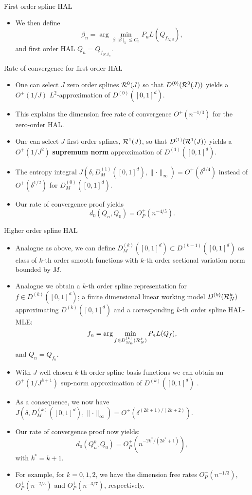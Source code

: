 \documentclass[t]{beamer}
\newlength{\wideitemsep}
\let\olditem\item
\renewcommand{\item}{\setlength{\itemsep}{\wideitemsep}\olditem}
\newcommand{\pl}{\parallel}
\begin{document}
\begin{frame}{First order spline HAL}
\begin{itemize}
\item We then define
\[
\beta_n=\arg\min_{\beta,\mid \beta\mid_1\leq C_n} P_n L(Q_{f_{N,\beta}}),\]
and first order HAL $Q_n=Q_{f_{N,\beta_n}}$.
\end{itemize}
\end{frame}
\begin{frame}{Rate of convergence for first order HAL}
\begin{itemize}
\item One can select $J$ zero order splines ${\cal R}^0(J)$ so that  $D^{(0)}({\cal R}^0(J))$ yields a $O^+(1/J)$ $L^2$-approximation of
$D^{(0)}([0,1]^d)$.
\item This explains the dimension free rate of convergence $O^+(n^{-1/3})$ for the zero-order HAL.
\item One can select $J$ first order splines, ${\cal R}^1(J)$, so that $D^{(1)}({\cal R}^1(J))$ yields a $O^+(1/J^2)$ {\bf supremum norm} approximation of $D^{(1)}([0,1]^d)$.
\item The entropy integral $J(\delta, D^{(1)}_M([0,1]^d),\pl \cdot\pl_{\infty})=O^+( \delta^{3/4})$ instead of $O^+(\delta^{1/2})$ for $D^{(0)}_M([0,1]^d)$.
\item Our rate of convergence proof  yields
\[
d_0(Q_n,Q_0)=O_P^+(n^{-4/5}).\]
\end{itemize}
\end{frame}
\begin{frame}{Higher order spline HAL}
\begin{itemize}
\item Analogue as above, we can define $D^{(k)}_M([0,1]^d)\subset D^{(k-1)}([0,1]^d)$ as class of $k$-th order smooth functions with $k$-th order sectional variation norm bounded by $M$.
\item Analogue we obtain a $k$-th order spline representation for $f\in D^{(k)}([0,1]^d)$; a finite dimensional linear working model $D^{(k)}({\cal R}^k_N)$ approximating $D^{(k)}([0,1]^d)$ and a corresponding $k$-th order spline HAL-MLE:
\[
f_n=\arg\min_{f\in D^{(k)}_{M_n}({\cal R}^k_N)}P_n L(Q_f),\]
and $Q_n=Q_{f_n}$.
\item With $J$ well chosen $k$-th order spline basis functions we can obtain an $O^+(1/J^{k+1})$ sup-norm approximation of $D^{(k)}([0,1]^d)$ .
\end{itemize}
\end{frame}
\begin{frame}
\begin{itemize}
\item As a consequence, we now have $J(\delta,D^{(k)}_M([0,1]^d),\pl\cdot\pl_{\infty})=O^+(\delta^{(2k+1)/(2k+2)})$.
\item Our rate of convergence proof now yields:
\[
d_0(Q_n^k,Q_0)=O^+_P(n^{-2k^*/(2k^*+1)}),\]
with $k^*=k+1$.
\item For example, for $k=0,1,2$, we have the dimension free rates $O_P^+(n^{-1/3})$, $O_P^+(n^{-2/5})$ and $O_P^+(n^{-3/7})$, respectively.
\end{itemize}
\end{frame}
\end{document}
